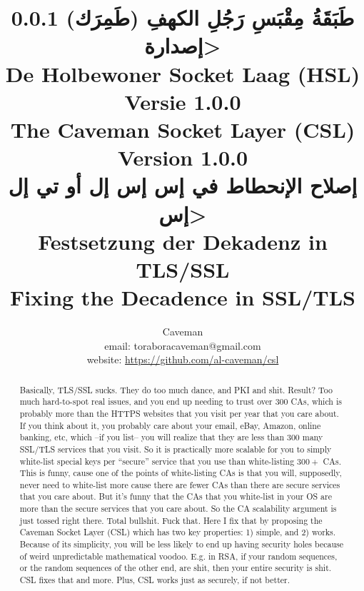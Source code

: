 \documentclass{article}
\author{Caveman\\
email: toraboracaveman@gmail.com\\
website: \url{https://github.com/al-caveman/csl}}
\title{
0.0.1 \<طَبَقَةُ مِقْبَسِ رَجُلِ الكهفِ (طَمِرَك) إصدارة>\\
De Holbewoner Socket Laag (HSL) Versie 1.0.0\\
The Caveman Socket Layer (CSL) Version 1.0.0\\
{\large \<إصلاح الإنحطاط في إس إس إل أو تي إل إس>}\\
{\large Festsetzung der Dekadenz in TLS/SSL}\\
{\large Fixing the Decadence in SSL/TLS}}
\begin{document}
 \maketitle
\begin{abstract}
    Basically, TLS/SSL sucks. They do too much dance, and PKI and shit. Result?
    Too much hard-to-spot real issues, and you end up needing to trust over
    $300$ CAs, which is probably more than the HTTPS websites that you visit
    per year that you care about. If you think about it, you probably care
    about your email, eBay, Amazon, online banking, etc, which --if you list--
    you will realize that they are less than $300$ many SSL/TLS services that
    you visit. So it is practically more scalable for you to simply white-list
    special keys per ``secure'' service that you use than white-listing $300+$
    CAs. This is funny, cause one of the points of white-listing CAs is that
    you will, supposedly, never need to white-list more cause there are fewer
    CAs than there are secure services that you care about. But it's funny that
    the CAs that you white-list in your OS are more than the secure services
    that you care about. So the CA scalability argument is just tossed right
    there. Total bullshit. Fuck that. Here I fix that by proposing the Caveman
    Socket Layer (CSL) which has two key properties: 1) simple, and 2) works.
    Because of its simplicity, you will be less likely to end up having
    security holes because of weird unpredictable mathematical voodoo. E.g. in
    RSA, if your random sequences, or the random sequences of the other end,
    are shit, then your entire security is shit.  CSL fixes that and more.
    Plus, CSL works just as securely, if not better.
\end{abstract}

\tableofcontents
\end{document}

